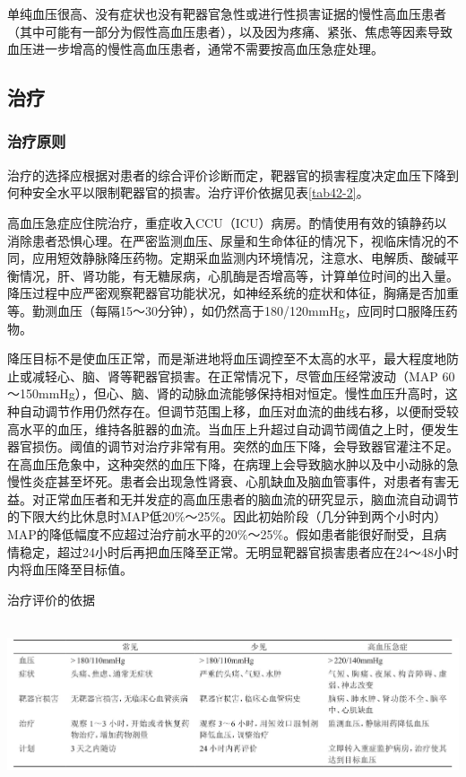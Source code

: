 单纯血压很高、没有症状也没有靶器官急性或进行性损害证据的慢性高血压患者（其中可能有一部分为假性高血压患者），以及因为疼痛、紧张、焦虑等因素导致血压进一步增高的慢性高血压患者，通常不需要按高血压急症处理。

\subsection{治疗}

\subsubsection{治疗原则}

治疗的选择应根据对患者的综合评价诊断而定，靶器官的损害程度决定血压下降到何种安全水平以限制靶器官的损害。治疗评价依据见表\ref{tab42-2}。

高血压急症应住院治疗，重症收入CCU（ICU）病房。酌情使用有效的镇静药以消除患者恐惧心理。在严密监测血压、尿量和生命体征的情况下，视临床情况的不同，应用短效静脉降压药物。定期采血监测内环境情况，注意水、电解质、酸碱平衡情况，肝、肾功能，有无糖尿病，心肌酶是否增高等，计算单位时间的出入量。降压过程中应严密观察靶器官功能状况，如神经系统的症状和体征，胸痛是否加重等。勤测血压（每隔15～30分钟），如仍然高于180/120mmHg，应同时口服降压药物。

降压目标不是使血压正常，而是渐进地将血压调控至不太高的水平，最大程度地防止或减轻心、脑、肾等靶器官损害。在正常情况下，尽管血压经常波动（MAP
60～150mmHg），但心、脑、肾的动脉血流能够保持相对恒定。慢性血压升高时，这种自动调节作用仍然存在。但调节范围上移，血压对血流的曲线右移，以便耐受较高水平的血压，维持各脏器的血流。当血压上升超过自动调节阈值之上时，便发生器官损伤。阈值的调节对治疗非常有用。突然的血压下降，会导致器官灌注不足。在高血压危象中，这种突然的血压下降，在病理上会导致脑水肿以及中小动脉的急慢性炎症甚至坏死。患者会出现急性肾衰、心肌缺血及脑血管事件，对患者有害无益。对正常血压者和无并发症的高血压患者的脑血流的研究显示，脑血流自动调节的下限大约比休息时MAP低20\%～25\%。因此初始阶段（几分钟到两个小时内）MAP的降低幅度不应超过治疗前水平的20\%～25\%。假如患者能很好耐受，且病情稳定，超过24小时后再把血压降至正常。无明显靶器官损害患者应在24～48小时内将血压降至目标值。

\begin{table}[htbp]
\centering
\caption{治疗评价的依据}
\label{tab42-2}
\includegraphics[width=6.64583in,height=1.91667in]{./images/Image00155.jpg}
\end{table}

